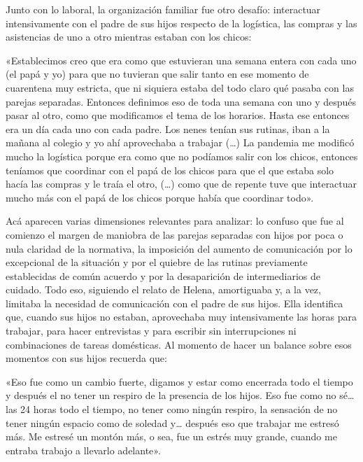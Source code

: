 \begin{refsection}
Junto con lo laboral, la organización familiar fue otro desafío: interactuar intensivamente con el padre de sus hijos respecto de la logística, las compras y las asistencias de uno a otro mientras estaban con los chicos:


\begin{gbcita}
«Establecimos creo que era como que estuvieran una semana entera con cada uno (el papá y yo) para que no tuvieran que salir tanto en ese momento de cuarentena muy estricta, que ni siquiera estaba del todo claro qué pasaba con las parejas separadas. Entonces definimos eso de toda una semana con uno y después pasar al otro, como que modificamos el tema de los horarios. Hasta ese entonces era un día cada uno con cada padre. Los nenes tenían sus rutinas, iban a la mañana al colegio y yo ahí aprovechaba a trabajar (…) La pandemia me modificó mucho la logística porque era como que no podíamos salir con los chicos, entonces teníamos que coordinar con el papá de los chicos para que el que estaba solo hacía las compras y le traía el otro, (…) como que de repente tuve que interactuar mucho más con el papá de los chicos porque había que coordinar todo».

\end{gbcita}

Acá aparecen varias dimensiones relevantes para analizar: lo confuso que fue al comienzo el margen de maniobra de las parejas separadas con hijos por poca o nula claridad de la normativa, la imposición del aumento de comunicación por lo excepcional de la situación y por el quiebre de las rutinas previamente establecidas de común acuerdo y por la desaparición de intermediarios de cuidado. Todo eso, siguiendo el relato de Helena, amortiguaba y, a la vez, limitaba la necesidad de comunicación con el padre de sus hijos. Ella identifica que, cuando sus hijos no estaban, aprovechaba muy intensivamente las horas para trabajar, para hacer entrevistas y para escribir sin interrupciones ni combinaciones de tareas domésticas. Al momento de hacer un balance sobre esos momentos con sus hijos recuerda que:


\begin{gbcita}
«Eso fue como un cambio fuerte, digamos y estar como encerrada todo el tiempo y después el no tener un respiro de la presencia de los hijos. Eso fue como no sé… las 24 horas todo el tiempo, no tener como ningún respiro, la sensación de no tener ningún espacio como de soledad y… después eso que trabajar me estresó más. Me estresé un montón más, o sea, fue un estrés muy grande, cuando me entraba trabajo a llevarlo adelante».


\end{gbcita}
\end{refsection}
